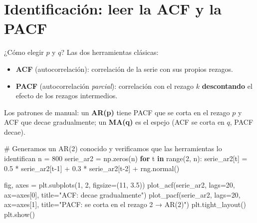 \documentclass[
  spanish,
  letterpaper,
  DIV=11,
  numbers=noendperiod]{scrreprt}
\newenvironment{Shaded}{\begin{snugshade}}{\end{snugshade}}
\newcommand{\BuiltInTok}[1]{\textcolor[rgb]{0.00,0.23,0.31}{#1}}
\newcommand{\CommentTok}[1]{\textcolor[rgb]{0.37,0.37,0.37}{#1}}
\newcommand{\ControlFlowTok}[1]{\textcolor[rgb]{0.00,0.23,0.31}{\textbf{#1}}}
\newcommand{\DecValTok}[1]{\textcolor[rgb]{0.68,0.00,0.00}{#1}}
\newcommand{\FloatTok}[1]{\textcolor[rgb]{0.68,0.00,0.00}{#1}}
\newcommand{\KeywordTok}[1]{\textcolor[rgb]{0.00,0.23,0.31}{\textbf{#1}}}
\newcommand{\NormalTok}[1]{\textcolor[rgb]{0.00,0.23,0.31}{#1}}
\newcommand{\OperatorTok}[1]{\textcolor[rgb]{0.37,0.37,0.37}{#1}}
\newcommand{\StringTok}[1]{\textcolor[rgb]{0.13,0.47,0.30}{#1}}
\providecommand{\tightlist}{%
  \setlength{\itemsep}{0pt}\setlength{\parskip}{0pt}}
\begin{document}
\section{Identificación: leer la ACF y la
PACF}\label{identificaciuxf3n-leer-la-acf-y-la-pacf}

¿Cómo elegir \(p\) y \(q\)? Las dos herramientas clásicas:

\begin{itemize}
\tightlist
\item
  \textbf{ACF} (autocorrelación): correlación de la serie con sus
  propios rezagos.
\item
  \textbf{PACF} (autocorrelación \emph{parcial}): correlación con el
  rezago \(k\) \textbf{descontando} el efecto de los rezagos
  intermedios.
\end{itemize}

Los patrones de manual: un \textbf{AR(p)} tiene PACF que se corta en el
rezago \(p\) y ACF que decae gradualmente; un \textbf{MA(q)} es el
espejo (ACF se corta en \(q\), PACF decae).

\begin{Shaded}
\begin{Highlighting}[]
\CommentTok{\# Generamos un AR(2) conocido y verificamos que las herramientas lo identifican}
\NormalTok{n }\OperatorTok{=} \DecValTok{800}
\NormalTok{serie\_ar2 }\OperatorTok{=}\NormalTok{ np.zeros(n)}
\ControlFlowTok{for}\NormalTok{ t }\KeywordTok{in} \BuiltInTok{range}\NormalTok{(}\DecValTok{2}\NormalTok{, n):}
\NormalTok{    serie\_ar2[t] }\OperatorTok{=} \FloatTok{0.5} \OperatorTok{*}\NormalTok{ serie\_ar2[t}\OperatorTok{{-}}\DecValTok{1}\NormalTok{] }\OperatorTok{+} \FloatTok{0.3} \OperatorTok{*}\NormalTok{ serie\_ar2[t}\OperatorTok{{-}}\DecValTok{2}\NormalTok{] }\OperatorTok{+}\NormalTok{ rng.normal()}

\NormalTok{fig, axes }\OperatorTok{=}\NormalTok{ plt.subplots(}\DecValTok{1}\NormalTok{, }\DecValTok{2}\NormalTok{, figsize}\OperatorTok{=}\NormalTok{(}\DecValTok{11}\NormalTok{, }\FloatTok{3.5}\NormalTok{))}
\NormalTok{plot\_acf(serie\_ar2, lags}\OperatorTok{=}\DecValTok{20}\NormalTok{, ax}\OperatorTok{=}\NormalTok{axes[}\DecValTok{0}\NormalTok{], title}\OperatorTok{=}\StringTok{"ACF: decae gradualmente"}\NormalTok{)}
\NormalTok{plot\_pacf(serie\_ar2, lags}\OperatorTok{=}\DecValTok{20}\NormalTok{, ax}\OperatorTok{=}\NormalTok{axes[}\DecValTok{1}\NormalTok{], title}\OperatorTok{=}\StringTok{"PACF: se corta en el rezago 2 → AR(2)"}\NormalTok{)}
\NormalTok{plt.tight\_layout()}
\NormalTok{plt.show()}
\end{Highlighting}
\end{Shaded}
\end{document}
